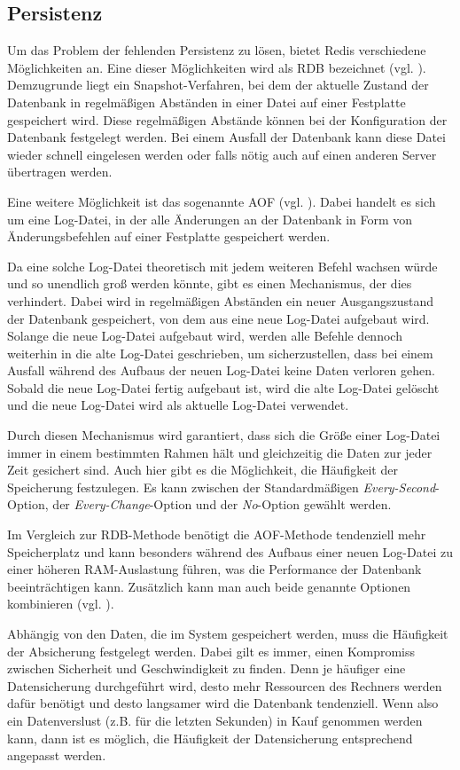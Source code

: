 
\subsection{Persistenz}
\label{sec:Persistenz}
Um das Problem der fehlenden Persistenz zu lösen, bietet \acs{Redis} verschiedene Möglichkeiten an.
Eine dieser Möglichkeiten wird als \ac{RDB} bezeichnet (vgl. \cite{Redis-Docs-Persistenz}). 
Demzugrunde liegt ein Snapshot-Verfahren, bei dem der aktuelle Zustand der Datenbank in regelmäßigen Abständen in einer Datei auf einer Festplatte gespeichert wird.
Diese regelmäßigen Abstände können bei der Konfiguration der Datenbank festgelegt werden. 
Bei einem Ausfall der Datenbank kann diese Datei wieder schnell eingelesen werden oder falls nötig auch auf einen anderen Server übertragen werden.

Eine weitere Möglichkeit ist das sogenannte \ac{AOF} (vgl. \cite{Redis-Docs-Persistenz}). 
Dabei handelt es sich um eine Log-Datei, in der alle Änderungen an der Datenbank in Form von Änderungsbefehlen auf einer Festplatte gespeichert werden.

Da eine solche Log-Datei theoretisch mit jedem weiteren Befehl wachsen würde und so unendlich groß werden könnte, gibt es einen Mechanismus, der dies verhindert.
Dabei wird in regelmäßigen Abständen ein neuer Ausgangszustand der Datenbank gespeichert, von dem aus eine neue Log-Datei aufgebaut wird. 
Solange die neue Log-Datei aufgebaut wird, werden alle Befehle dennoch weiterhin in die alte Log-Datei geschrieben, um sicherzustellen, dass bei einem Ausfall während des Aufbaus der neuen Log-Datei keine Daten verloren gehen.
Sobald die neue Log-Datei fertig aufgebaut ist, wird die alte Log-Datei gelöscht und die neue Log-Datei wird als aktuelle Log-Datei verwendet.

Durch diesen Mechanismus wird garantiert, dass sich die Größe einer Log-Datei immer in einem bestimmten Rahmen hält und gleichzeitig die Daten zur jeder Zeit gesichert sind.
Auch hier gibt es die Möglichkeit, die Häufigkeit der Speicherung festzulegen. Es kann zwischen der Standardmäßigen \textit{Every-Second}-Option, der \textit{Every-Change}-Option und der \textit{No}-Option gewählt werden.

Im Vergleich zur \acs{RDB}-Methode benötigt die \acs{AOF}-Methode tendenziell mehr Speicherplatz und kann besonders während des Aufbaus einer neuen Log-Datei zu einer höheren \acs{RAM}-Auslastung führen, was die Performance der Datenbank beeinträchtigen kann.
Zusätzlich kann man auch beide genannte Optionen kombinieren (vgl. \cite{Redis-Docs-Persistenz}).

Abhängig von den Daten, die im System gespeichert werden, muss die Häufigkeit der Absicherung festgelegt werden.
Dabei gilt es immer, einen Kompromiss zwischen Sicherheit und Geschwindigkeit zu finden.
Denn je häufiger eine Datensicherung durchgeführt wird, desto mehr Ressourcen des Rechners werden dafür benötigt und desto langsamer wird die Datenbank tendenziell.
Wenn also ein Datenverslust (z.B. für die letzten Sekunden) in Kauf genommen werden kann, dann ist es möglich, die Häufigkeit der Datensicherung entsprechend angepasst werden.

